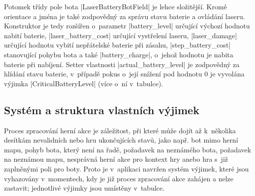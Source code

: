 \begin{sloppypar}
    Potomek třídy pole bota \ic|LaserBatteryBotField| je lehce složitější. Kromě orientace a jména je také zodpovědný za správu stavu baterie a ovládání laseru. Konstruktor je tedy rozšířen o~parametr \ic|battery_level| určující výchozí hodnotu nabití baterie, \ic|laser_battery_cost| určující  vystřelení laseru, \ic|laser_damage| určující hodnotu vybití nepřátelské baterie při zásahu, \ic|step_battery_cost| stanovující  pohybu bota a také \ic|battery_charge|, o~jehož hodnotu je nabita baterie při nabíjení. Setter vlastnosti \ic|actual_battery_level| je zodpovědný za hlídání stavu baterie, v~případě pokus o~její snížení pod hodnotu $0$ je vyvolána výjimka \ic|CriticalBatteryLevel| (více o~ní v~tabulce).
\end{sloppypar}

\subsection{Systém a struktura vlastních výjimek}
\label{subsec:custom-exceptions}

Proces zpracování herní akce je záležitost, při které může dojít až k~několika desítkám nevalidních nebo hru ukončujících stavů, jako např. bot mimo herní mapu, pohyb bota, který není na řadě, požadavek na neznámého bota, požadavek na neznámou mapu, nesprávná herní akce pro kontext hry anebo hra s~již zaplněnými poli pro boty. Proto je v~aplikaci navržen systém výjimek, které jsou vyhazovány v~momentech, kdy je již proces zpracování akce zahájen a nelze zastavit; jednotlivé výjimky jsou umístěny v~tabulce.

